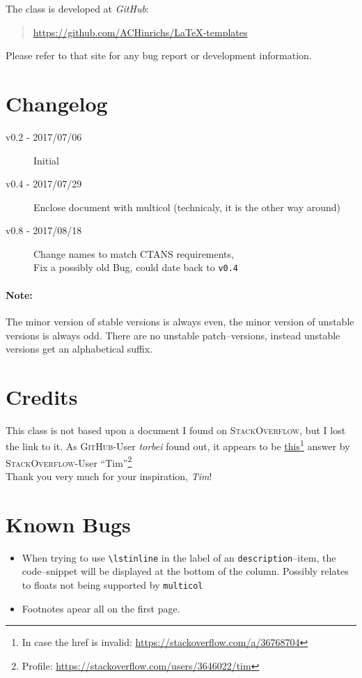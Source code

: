 \documentclass[a4paper,landscape,columns=3]{cheatsheet}
\begin{document}
The class is developed at \emph{GitHub}:
\begin{quote}
  \url{https://github.com/ACHinrichs/LaTeX-templates}
\end{quote}
Please refer to that site for any bug report or development
information. 
\section{Changelog}
\begin{description}
\item[v0.2 - 2017/07/06] Initial
\item[v0.4 - 2017/07/29] Enclose document with multicol (technicaly,
  it is the other way around)
\item[v0.8 - 2017/08/18] Change names to match CTANS requirements,\\
  Fix a possibly old Bug, could date back to \lstinline{v0.4}
\end{description}
\paragraph{Note: }The minor version of stable versions is always even,
the minor version of unstable versions is always odd. There are no
unstable patch--versions, instead unstable versions get an
alphabetical suffix.\\

\section{Credits}
This class is not based upon a document I found on
\textsc{StackOverflow}, but I lost the link to it. As \textsc{GitHub}-User
\emph{torbei} found out, it appears to be
\href{https://stackoverflow.com/a/36768704}{this}\footnote{In case the
href is invalid: \url{https://stackoverflow.com/a/36768704}} answer by
\textsc{StackOverflow}-User \enquote{Tim}\footnote{Profile:
  \url{https://stackoverflow.com/users/3646022/tim}}\\

Thank you very much for your inspiration, \emph{Tim}!

\section{Known Bugs}
\begin{itemize}
\item When trying to use \lstinline{\lstinline} in the label of an
  \lstinline{description}--item, the code--snippet will be displayed
  at the bottom of the column. Possibly relates to floats not being
  supported by \lstinline{multicol}%
\item Footnotes apear all on the first page.
\end{itemize}
\end{document}
